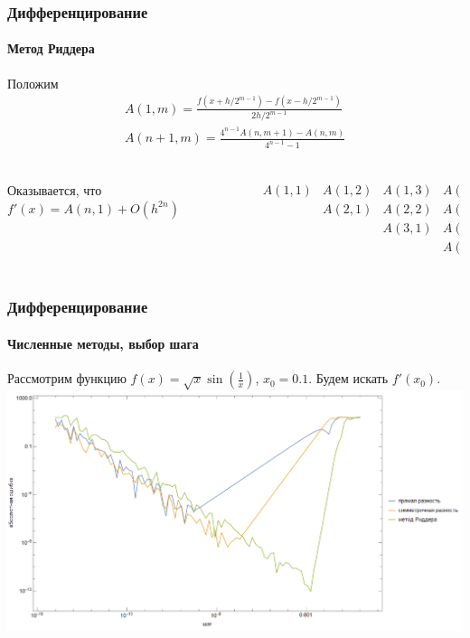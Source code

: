 \documentclass[notheorems,aspectratio=169]{beamer}
\begin{document}
\begin{frame}
  \frametitle{Дифференцирование}
  \framesubtitle{Метод Риддера}
  Положим 
  \begin{equation*}
    \begin{gathered}
      A\left(1, m\right)=\frac{f\left(x+h/2^{m-1}\right)-f\left(x-h/2^{m-1}\right)}{2h/2^{m-1}} \\
      A\left(n+1, m\right)=\frac{4^{n-1}A\left(n,m+1\right)-A\left(n,m\right)}{4^{n-1}-1} \\
    \end{gathered}
  \end{equation*}
  \vspace{1cm}
  \begin{columns}[c]
    \begin{column}{0.5\textwidth}
      Оказывается, что $f'\left(x\right)=A\left(n,1\right)+O\left(h^{2n}\right)$
    \end{column}
    \begin{column}{0.5\textwidth}
      $$
      \begin{matrix}
        A\left(1,1\right) & A\left(1,2\right) & A\left(1,3\right) & A\left(1,4\right) \\
                          & A\left(2,1\right) & A\left(2,2\right) & A\left(2,3\right) \\
                          &                   & A\left(3,1\right) & A\left(3,2\right) \\
                          &                   &                   & A\left(4,1\right) \\
      \end{matrix}
      $$
    \end{column}
  \end{columns}
\end{frame}

\begin{frame}
  \frametitle{Дифференцирование}
  \framesubtitle{Численные методы, выбор шага}
  Рассмотрим функцию $f\left(x\right)=\sqrt{x}\sin\left(\frac{1}{x}\right)$, $x_0=0.1$. Будем искать $f'\left(x_0\right)$.
  \includegraphics[height=0.65\textheight, keepaspectratio]{diff-err.png}
\end{frame}
\end{document}
